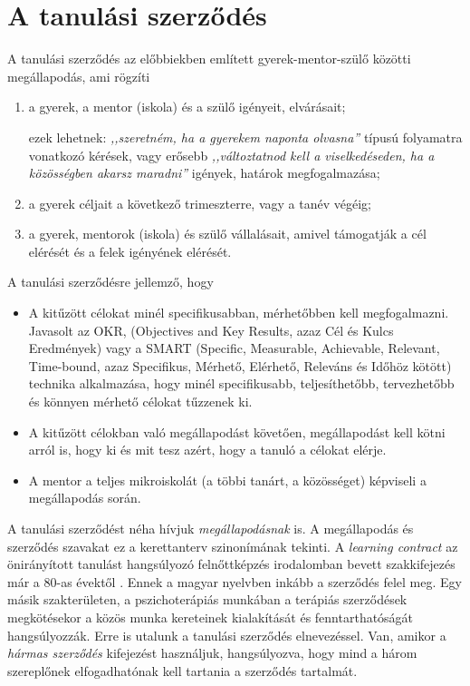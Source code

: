 \section{A tanulási szerződés}

A tanulási szerződés az előbbiekben említett gyerek-mentor-szülő közötti
megállapodás, ami rögzíti
\begin{enumerate}
  \item a gyerek, a mentor (iskola) és a szülő igényeit, elvárásait;

        ezek lehetnek: \emph{,,szeretném, ha a gyerekem naponta olvasna''} típusú
        folyamatra vonatkozó kérések, vagy erősebb \emph{,,változtatnod kell a
          viselkedéseden, ha a közösségben akarsz maradni''} igények, határok
        megfogalmazása;

  \item a gyerek céljait a következő trimeszterre, vagy a tanév végéig;

  \item a gyerek, mentorok (iskola) és szülő vállalásait, amivel támogatják a cél
        elérését és a felek igényének elérését.

\end{enumerate}

A tanulási szerződésre jellemző, hogy
\begin{itemize}
  \item A kitűzött célokat minél specifikusabban, mérhetőbben kell megfogalmazni.
        Javasolt az OKR,  (Objectives and Key Results, azaz  Cél és Kulcs Eredmények)
        \citep{okr} vagy a SMART (Specific, Measurable, Achievable, Relevant,
        Time-bound, azaz Specifikus,  Mérhető, Elérhető, Releváns és Időhöz kötött)
        \citep{wiki:smart} technika alkalmazása, hogy minél specifikusabb,
        teljesíthetőbb, tervezhetőbb és könnyen mérhető célokat tűzzenek ki.

  \item A kitűzött célokban való megállapodást követően, megállapodást  kell
        kötni arról is, hogy ki és mit tesz azért, hogy a tanuló a célokat elérje.

  \item A mentor a teljes mikroiskolát (a többi tanárt, a közösséget) képviseli a
        megállapodás során.
\end{itemize}

A tanulási szerződést néha hívjuk \emph{megállapodásnak} is. A megállapodás és
szerződés szavakat ez a kerettanterv szinonímának tekinti. A \emph{learn\-ing
  con\-tract} az önirányított tanulást hangsúlyozó felnőttképzés irodalomban
bevett szakkifejezés már a 80-as évektől \citep{Malcolm77}. Ennek a magyar
nyelvben inkább a szerződés felel meg. Egy másik szakterületen, a
pszichoterápiás munkában a terápiás szerződések megkötésekor a közös munka
kereteinek kialakítását és fenntarthatóságát hangsúlyozzák.
\citep{pszichoterapia} Erre is utalunk a tanulási szerződés elnevezéssel. Van,
amikor a \emph{hármas szerződés} kifejezést használjuk, hangsúlyozva, hogy mind
a három szereplőnek elfogadhatónak kell tartania a szerződés tartalmát.

